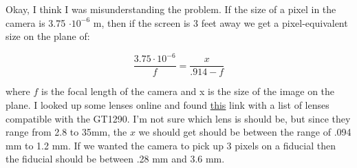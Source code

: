 \documentclass[10pt]{scrartcl}
\begin{document}
Okay, I think I was misunderstanding the problem. If the size of a pixel in the camera is 3.75 $\cdot 10^{-6}$ m, then if the screen is 3 feet away we get a pixel-equivalent size on the plane of:

\begin{equation}
    \frac{3.75 \cdot 10^{-6}}{f} = \frac{x}{.914-f}
\end{equation}

where $f$ is the focal length of the camera and x is the size of the image on the plane. I looked up some lenses online and found \href{https://www.google.com/url?sa=t&rct=j&q=&esrc=s&source=web&cd=1&ved=0CC0QFjAA&url=http%3A%2F%2Fwww.alliedvisiontec.com%2Ffileadmin%2Fcontent%2FPDF%2FSupport%2FApplication_Notes%2FAppNote_-_P-iris_Lenses_Supported_by_Prosilica_GT_Cameras.pdf&ei=hRLJUZm1HsXOigLD0IG4CQ&usg=AFQjCNF-aFAU2X5gxcTo2KmQX8LpryrS1w&sig2=fpd-xRjTL72Boc71IcL5VA&bvm=bv.48340889,d.cGE&cad=rja}{this} link with a list of lenses compatible with the GT1290. I'm not sure which lens is should be, but since they range from 2.8 to 35mm, the $x$ we should get should be between the range of .094 mm to 1.2 mm. If we wanted the camera to pick up 3 pixels on a fiducial then the fiducial should be between .28 mm and 3.6 mm.
\end{document}
